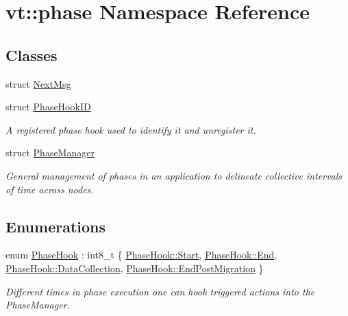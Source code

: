 \hypertarget{namespacevt_1_1phase}{}\section{vt\+:\+:phase Namespace Reference}
\label{namespacevt_1_1phase}
\subsection*{Classes}
\begin{DoxyCompactItemize}
\item 
struct \hyperlink{structvt_1_1phase_1_1_next_msg}{Next\+Msg}
\item 
struct \hyperlink{structvt_1_1phase_1_1_phase_hook_i_d}{Phase\+Hook\+ID}
\begin{DoxyCompactList}\small\item\em A registered phase hook used to identify it and unregister it. \end{DoxyCompactList}\item 
struct \hyperlink{structvt_1_1phase_1_1_phase_manager}{Phase\+Manager}
\begin{DoxyCompactList}\small\item\em General management of phases in an application to delineate collective intervals of time across nodes. \end{DoxyCompactList}\end{DoxyCompactItemize}
\subsection*{Enumerations}
\begin{DoxyCompactItemize}
\item 
enum \hyperlink{namespacevt_1_1phase_aec9a63fdd99680d7a7fe99d321193811}{Phase\+Hook} \+: int8\+\_\+t \{ \hyperlink{namespacevt_1_1phase_aec9a63fdd99680d7a7fe99d321193811aa6122a65eaa676f700ae68d393054a37}{Phase\+Hook\+::\+Start}, 
\hyperlink{namespacevt_1_1phase_aec9a63fdd99680d7a7fe99d321193811a87557f11575c0ad78e4e28abedc13b6e}{Phase\+Hook\+::\+End}, 
\hyperlink{namespacevt_1_1phase_aec9a63fdd99680d7a7fe99d321193811ae9b52b42e3fb150bbdd851e4ad7bfa4c}{Phase\+Hook\+::\+Data\+Collection}, 
\hyperlink{namespacevt_1_1phase_aec9a63fdd99680d7a7fe99d321193811a92bbcee517f28808f9795872094c0f08}{Phase\+Hook\+::\+End\+Post\+Migration}
 \}\begin{DoxyCompactList}\small\item\em Different times in phase execution one can hook triggered actions into the {\ttfamily Phase\+Manager}. \end{DoxyCompactList}
\end{DoxyCompactItemize}


